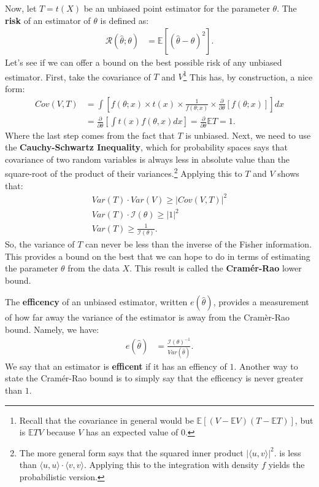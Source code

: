 \documentclass{tufte-handout}
\begin{document}
Now, let $T = t(X)$ be an unbiased point estimator for the parameter $\theta$.
The \textbf{risk} of an estimator of $\theta$ is defined as:
\begin{align*}
\mathcal{R}(\hat{\theta}; \theta) &= \mathbb{E}\left[ (\hat{\theta} - \theta)^2 \right].
\end{align*}
Let's see if we can offer a bound on the best possible risk of any
unbiased estimator. First, take the covariance of $T$ and $V$\footnote{
  Recall that the covariance in general would be $\mathbb{E}[(V - \mathbb{E}V)(T - \mathbb{E}T)]$,
  but is $\mathbb{E}TV$ because $V$ has an expected value of $0$.
} This has, by construction, a nice form:
\begin{align*}
Cov(V, T) &= \int \left[ f(\theta; x) \times t(x) \times \frac{1}{f(\theta; x)} \times \frac{\partial}{\partial \theta} \left[ f(\theta; x) \right] \right] dx \\
&= \frac{\partial}{\partial \theta} \left[ \int t(x) f(\theta, x) dx \right] = \frac{\partial}{\partial \theta} \mathbb{E}T = 1.
\end{align*}
Where the last step comes from the fact that $T$ is unbiased.
Next, we need to use the \textbf{Cauchy-Schwartz Inequality}, which for
probability spaces says that covariance of two random variables is always
less in absolute value than the square-root of the product of their
variances.\footnote{
  The more general form says that the squared inner product $| \langle u, v\rangle |^2$.
  is less than $\langle u, u\rangle \cdot \langle v, v\rangle$. Applying this to
  the integration with density $f$ yields the probabilistic version.
} Applying this to $T$ and $V$ shows that:
\begin{align*}
Var(T) \cdot Var(V) \geq | Cov(V, T) |^2  \\
Var(T) \cdot \mathcal{I}(\theta) \geq | 1 |^2  \\
Var(T) \geq \frac{1}{\mathcal{I}(\theta)}.
\end{align*}
So, the variance of $T$ can never be less than the inverse of the Fisher
information. This provides a bound on the best that we can hope to do in terms
of estimating the parameter $\theta$ from the data $X$. This result is called the
\textbf{Cramér-Rao} lower bound.

The \textbf{efficency} of an unbiased estimator, written $e(\widehat{\theta})$, 
provides a measurement of how far away the variance of the estimator is 
away from the Cramèr-Rao bound. Namely, we have:
\begin{align*}
e(\widehat{\theta}) &= \frac{\mathcal{I}(\theta)^{-1}}{Var(\widehat{\theta})}.
\end{align*}
We say that an estimator is \textbf{efficent} if it has an effiency of $1$.
Another way to state the Cramér-Rao bound is to simply say that the efficency
is never greater than $1$.
\end{document}
